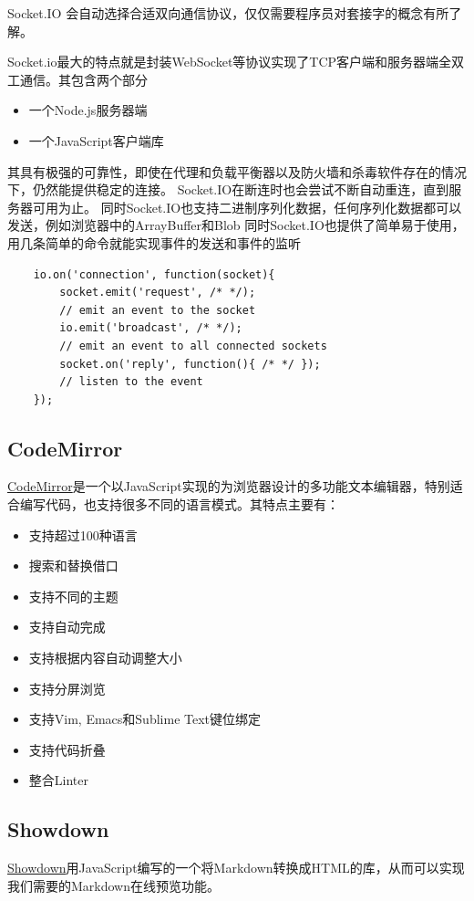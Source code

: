 \documentclass[11pt]{ctexart}
\begin{document}
Socket.IO 会自动选择合适双向通信协议，仅仅需要程序员对套接字的概念有所了解。

Socket.io最大的特点就是封装WebSocket等协议实现了TCP客户端和服务器端全双工通信。其包含两个部分
\begin{itemize}
	\item 一个Node.js服务器端
	\item 一个JavaScript客户端库
\end{itemize}
其具有极强的可靠性，即使在代理和负载平衡器以及防火墙和杀毒软件存在的情况下，仍然能提供稳定的连接。
Socket.IO在断连时也会尝试不断自动重连，直到服务器可用为止。
同时Socket.IO也支持二进制序列化数据，任何序列化数据都可以发送，例如浏览器中的ArrayBuffer和Blob
同时Socket.IO也提供了简单易于使用，用几条简单的命令就能实现事件的发送和事件的监听
\begin{verbatim}
    io.on('connection', function(socket){
        socket.emit('request', /* */);
        // emit an event to the socket
        io.emit('broadcast', /* */);
        // emit an event to all connected sockets
        socket.on('reply', function(){ /* */ }); 
        // listen to the event
    });
\end{verbatim}
\subsection{CodeMirror}
\href{http://codemirror.net/}{CodeMirror}是一个以JavaScript实现的为浏览器设计的多功能文本编辑器，特别适合编写代码，也支持很多不同的语言模式。其特点主要有：
\begin{itemize}
	\item 支持超过100种语言
	\item 搜索和替换借口
	\item 支持不同的主题
	\item 支持自动完成
	\item 支持根据内容自动调整大小
	\item 支持分屏浏览
	\item 支持Vim, Emacs和Sublime Text键位绑定
	\item 支持代码折叠
	\item 整合Linter 
\end{itemize}
\subsection{Showdown}
\href{http://showdownjs.com/}{Showdown}用JavaScript编写的一个将Markdown转换成HTML的库，从而可以实现我们需要的Markdown在线预览功能。
\end{document}
